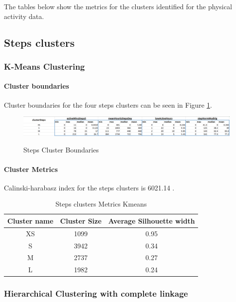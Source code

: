 \documentclass{article}
\begin{document}
The tables below show the metrics for the clusters identified for the physical activity data. 

\subsection{Steps clusters}

\subsubsection{K-Means Clustering}

\paragraph{Cluster boundaries}
Cluster boundaries for the four steps clusters can be seen in Figure \ref{fig:stepsBoundaries}.

\begin{figure}[H]
  \centering
  \caption{Steps Cluster Boundaries}
  \includegraphics[scale=0.5]{steps_cluster_boundaries.png}
  \label{fig:stepsBoundaries}
\end{figure}

\paragraph{Cluster Metrics}
Calinski-harabasz index for the steps clusters is 6021.14 .

\begin{table}[H]
  \caption{Steps clusters Metrics Kmeans}
  \label{steps_metrics}
  \centering
  \begin{tabular}{ c|c|c}
    \toprule
    \cmidrule(r){1-2}
    Cluster name & Cluster Size & Average Silhouette width \\
    \midrule
    XS & 1099 & 0.95 \\
    S & 3942 & 0.34 \\
    M & 2737 & 0.27 \\
    L & 1982 & 0.24 \\
    \bottomrule
    \end{tabular}
\end{table}

\subsubsection{Hierarchical Clustering with complete linkage}
\end{document}
